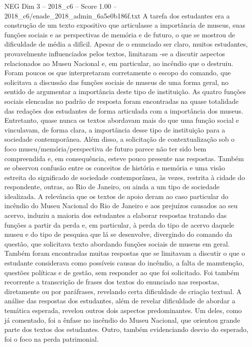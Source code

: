 \begin{textsample}{NEG Dim 3 – 2018\_c6 – Score 1.00 – 2018\_c6/enade\_2018\_admin\_6a5e0b186f.txt}
A tarefa dos estudantes era a construção de um texto expositivo que articulasse a importância de museus, suas funções sociais e as perspectivas de memória e de futuro, o que se mostrou de dificuldade de média a difícil.
Apesar de o enunciado ser claro, muitos estudantes, provavelmente influenciados pelos textos, limitaram -se a discutir aspectos relacionados ao Museu Nacional e, em particular, ao incêndio que o destruiu.
Foram poucos os que interpretaram corretamente o escopo do comando, que solicitava a discussão das funções sociais de museus de uma forma geral, no sentido de argumentar a importância deste tipo de instituição.
As quatro funções sociais elencadas no padrão de resposta foram encontradas na quase totalidade das redações dos estudantes de forma articulada com a importância dos museus.
Entretanto, quase nunca os textos abordavam mais do que uma função social e vinculavam, de forma clara, a importância desse tipo de instituição para a sociedade contemporânea.
Além disso, a solicitação de contextualização sob o foco museu/memória/perspectiva de futuro parece não ter sido bem compreendida e, em consequência, esteve pouco presente nas respostas.
Também se observou confusão entre os conceitos de história e memória e uma visão estreita do significado de sociedade contemporânea, às vezes, restrita à cidade do respondente, outras, ao Rio de Janeiro, ou ainda a um tipo de sociedade idealizada.
A relevância que os textos de apoio deram ao caso particular do incêndio do Museu Nacional do Rio de Janeiro e aos prejuízos causados ao seu acervo, induziu a maioria dos estudantes a elaborar respostas tratando das funções a partir da perda e, em particular, à perda do tipo de acervo daquele museu e do tipo de pesquisa que lá se desenvolve, divergindo do comando da questão, que solicitava texto abordando funções sociais de museus em geral.
Também foram encontradas muitas respostas que se limitavam a discutir o que o estudante considerava como possíveis causas do incêndio, a falta de manutenção, questões políticas e de gestão, sem responder ao que foi solicitado.
Foi também recorrente a transcrição de frases dos textos do enunciado nas respostas, diretamente ou por paráfrases, revelando certa dificuldade de criação textual.
A análise das respostas dos estudantes, além de revelar dificuldade de abordar a temática esperada, revelou outros dois aspectos predominantes.
Um deles, como já comentado, foi a ênfase no incêndio do Museu Nacional, que orientou grande parte dos textos dos estudantes.
Outro, também evidenciando desvio do esperado, foi o foco na perda patrimonial.

\end{textsample}
